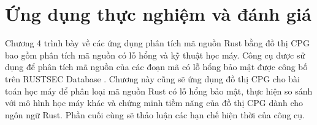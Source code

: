 \chapter{Ứng dụng thực nghiệm và đánh giá}
\label{chap:experiment}


Chương 4 trình bày về các ứng dụng phân tích mã nguồn Rust bằng đồ thị CPG bao gồm phân tích mã nguồn có lỗ hổng và kỹ thuật học máy.
Công cụ được sử dụng để phân tích mã nguồn của các đoạn mã có lỗ hổng bảo mật được công bố trên RUSTSEC Database \cite{rustsecAboutRustSec}.
Chương này cũng sẽ ứng dụng đồ thị CPG cho bài toán học máy để phân loại mã nguồn Rust có lỗ hổng bảo mật, thực hiện so sánh với mô hình học máy khác và chứng minh tiềm năng của đồ thị CPG dành cho ngôn ngữ Rust.
Phần cuối cùng sẽ thảo luận các hạn chế hiện thời của công cụ.




